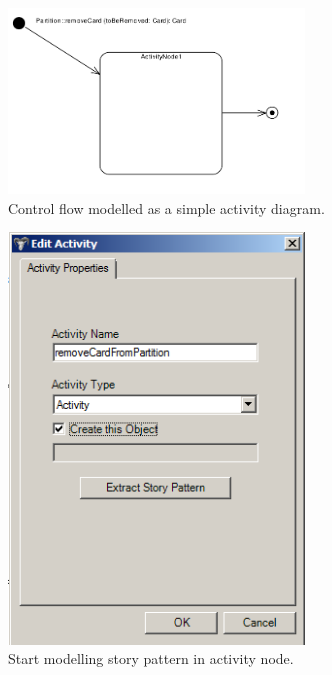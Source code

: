 \begin{figure}[htp]
\begin{center}
  \includegraphics[width=0.7\textwidth]{pics/sdmBilder/removeCard/sdm06RAW}
  \caption{Control flow modelled as a simple activity diagram.}  
  \label{fig:sdm_complete_control_flow}
\end{center}
\end{figure}

\begin{figure}[htp]
\begin{center}
  \includegraphics[width=0.7\textwidth]{pics/sdmBilder/removeCard/sdm07RAW}
  \caption{Start modelling story pattern in activity node.}  
  \label{fig:story_pattern}
\end{center}
\end{figure}

